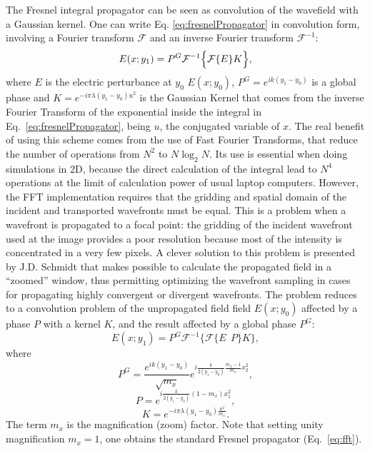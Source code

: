\documentclass{iucr}
\newcommand{\inblue}[1]{{\color{black}#1}}
\begin{document}
The Fresnel integral propagator can be seen as convolution of the wavefield with a Gaussian kernel. One can write Eq. \ref{eq:fresnelPropagator} in convolution form, involving \inblue{a Fourier transform $\mathcal{F}$ and an inverse Fourier transform $\mathcal{F}^{-1}$}\cite{goodmanfourier}:
\begin{equation}\label{eq:fft}
E(x; y_1) = \inblue{P^G} \mathcal{F}^{-1}\Big\{ \mathcal{F}\{E\} K \Big\},
\end{equation} 
where \inblue{$E$ is the electric perturbance at $y_0$ $E(x;y_0)$, $P^G=e^{i k (y_1-y_0)}$ is a global phase and $K=e^{-i \pi \lambda (y_1-y_0) u^2}$ is the Gaussian Kernel } that comes from the inverse Fourier Transform of the exponential inside the integral in Eq.~\ref{eq:fresnelPropagator}, being $u$, the conjugated variable of $x$.
The real benefit of using this scheme comes from the use of Fast Fourier Transforms, that reduce the number of operations from $N^2$ to $N \log_2 N$. Its use is essential when doing simulations in 2D, because the direct calculation of the integral lead to $N^4$ operations at the limit of calculation power of usual laptop computers. However, the FFT implementation requires that the gridding and spatial domain of the incident and transported wavefronts must be equal. This is a problem when a wavefront is propagated to a focal point: the gridding of the incident wavefront used at the image provides a poor resolution because most of the intensity is concentrated in a very few pixels. A clever solution to this problem is presented by J.D. Schmidt \cite{schmidt} that makes possible to calculate the propagated field in a ``zoomed'' window, thus permitting optimizing the wavefront sampling in cases for propagating highly convergent or divergent wavefronts. The problem reduces to a convolution problem of the unpropagated field field $E(x;y_0)$ affected by a phase $P$ with a kernel $K$, and the result affected by a global phase $P^G$: 
\begin{equation}
E(x; y_1) = P^G \mathcal{F}^{-1} \Big\{ \mathcal{F} \big\{ E~~P \big\} K \Big\},
\end{equation}
where
\begin{equation}
P^G =  \frac { e^{ik(y_1-y_0) }}{\sqrt{m_x} }e^{i \frac{k}{2 (y_1-y_0)} \frac{m_x - 1}{m_x}x_2^2},
\end{equation}
\begin{equation}
P = e^{i \frac{k}{2(y_1-y_0)} (1-m_x)x_1^2 },
\end{equation}
\begin{equation}
K = e^{-i \pi \lambda (y_1-y_0) \frac{u^2}{m_x} }.
\end{equation}
The term $m_x$ is the magnification (zoom) factor. 
Note that setting unity magnification $m_x=1$, one obtains the standard Fresnel propagator (Eq.~\ref{eq:fft}).
\end{document}
